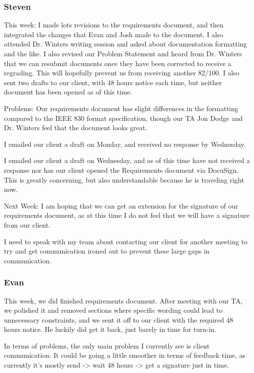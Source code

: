 \documentclass[onecolumn, draftclsnofoot,10pt, compsoc]{IEEEtran}
\begin{document}
\subsubsection{Steven}

This week: I made lots revisions to the requirements document, and then integrated the changes that Evan and Josh made to the document. I also attended Dr. Winters writing session and asked about documentation formatting and the like. I also revised our Problem Statement and heard from Dr. Winters that we can resubmit documents once they have been corrected to receive a regrading. This will hopefully prevent us from receiving another 82/100.
I also sent two drafts to our client, with 48 hours notice each time, but neither document has been opened as of this time.

Problems: Our requirements document has slight differences in the formatting compared to the IEEE 830 format specification, though our TA Jon Dodge and Dr. Winters feel that the document looks great. 

I emailed our client a draft on Monday, and received no response by Wednesday.

I emailed our client a draft on Wednesday, and as of this time have not received a response nor has our client opened the Requirements document via DocuSign. This is greatly concerning, but also understandable because he is traveling right now.

Next Week:
I am hoping that we can get an extension for the signature of our requirements document, as at this time I do not feel that we will have a signature from our client.

I need to speak with my team about contacting our client for another meeting to try and get communication ironed out to prevent these large gaps in communication.

\subsubsection{Evan}

This week, we did finished requirements document. After meeting with our TA, we polished it and removed sections where specific wording could lead to unnecessary constraints, and we sent it off to our client with the required 48 hours notice. He luckily did get it back, just barely in time for turn-in. 

In terms of problems, the only main problem I currently see is client communication. It could be going a little smoother in terms of feedback time, as currently it's mostly send -> wait 48 hours -> get a signature just in time. 
\end{document}

